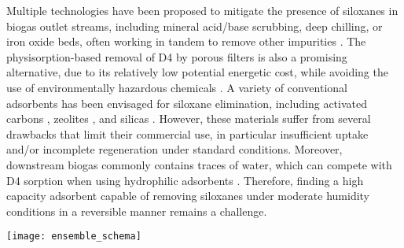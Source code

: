 Multiple technologies have been proposed to mitigate the presence of siloxanes
in biogas outlet streams, including mineral acid/base scrubbing, deep chilling,
or iron oxide beds, often working in tandem to remove other impurities
\citep{kuhnRequirementsTechniquesCosts2017}. The physisorption-based removal of
D4 by porous filters is also a promising alternative, due to its relatively low
potential energetic cost, while avoiding the use of environmentally hazardous
chemicals \citep{chinStatisticalAnalysisTrace2020,
ajharSiloxaneRemovalLandfill2010}. A variety of conventional adsorbents has been
envisaged for siloxane elimination, including activated carbons
\citep{finocchioDecompositionHexamethylcyclotrisiloxaneSolid2008}, zeolites
\citep{montanariPurificationLandfillBiogases2010}, and silicas
\citep{sigotAdsorptionOctamethylcyclotetrasiloxaneD42015}. However, these
materials suffer from several drawbacks that limit their commercial use, in
particular insufficient uptake and/or incomplete regeneration under standard
conditions. Moreover, downstream biogas commonly contains traces of water, which
can compete with D4 sorption when using hydrophilic adsorbents
\citep{kuhnRequirementsTechniquesCosts2017,schweigkoflerRemovalSiloxanesBiogases2001}.
Therefore, finding a high capacity adsorbent capable of removing siloxanes under
moderate humidity conditions in a reversible manner remains a challenge.

\begin{widefigure}[htb]
    \centering
    \texttt{[image: ensemble\_schema]}
    \caption{%
        Workflow of the strategy applied to identify the best MOFs for
        D4 adsorption, narrowing down candidates from top to bottom through
        synergistic computational (left) and experimental (right) actions. The
        final MOF candidate, PCN-777, is highlighted.
    }\label{fig:overview}
\end{widefigure}

